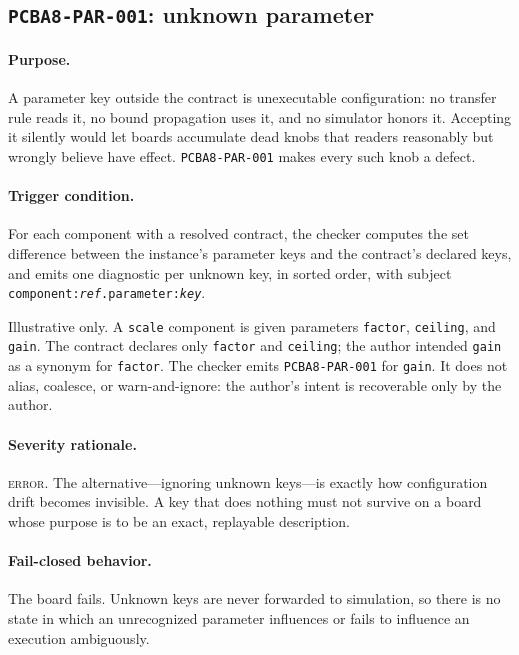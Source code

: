 \subsection{\texttt{PCBA8-PAR-001}: unknown parameter}\label{ch07:sub:par001}

\paragraph{Purpose.} A parameter key outside the contract is unexecutable configuration: no transfer rule reads it, no bound propagation uses it, and no simulator honors it. Accepting it silently would let boards accumulate dead knobs that readers reasonably but wrongly believe have effect. \texttt{PCBA8-PAR-001} makes every such knob a defect.

\paragraph{Trigger condition.} For each component with a resolved contract, the checker computes the set difference between the instance's parameter keys and the contract's declared keys, and emits one diagnostic per unknown key, in sorted order, with subject \texttt{component:\emph{ref}.parameter:\emph{key}}.

\begin{example}\label{ch07:ex:par001}
Illustrative only. A \texttt{scale} component is given parameters \texttt{factor}, \texttt{ceiling}, and \texttt{gain}. The contract declares only \texttt{factor} and \texttt{ceiling}; the author intended \texttt{gain} as a synonym for \texttt{factor}. The checker emits \texttt{PCBA8-PAR-001} for \texttt{gain}. It does not alias, coalesce, or warn-and-ignore: the author's intent is recoverable only by the author.
\end{example}

\paragraph{Severity rationale.} \textsc{error}. The alternative---ignoring unknown keys---is exactly how configuration drift becomes invisible. A key that does nothing must not survive on a board whose purpose is to be an exact, replayable description.

\paragraph{Fail-closed behavior.} The board fails. Unknown keys are never forwarded to simulation, so there is no state in which an unrecognized parameter influences or fails to influence an execution ambiguously.

